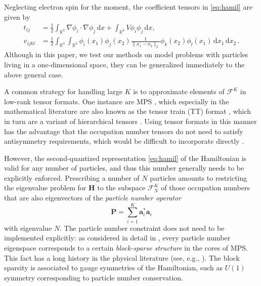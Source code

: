 \documentclass[a4paper,11pt,oneside]{amsart}
\providecommand{\norm}[1]{\lVert#1\rVert}
\theoremstyle{definition}
\theoremstyle{remark}
\newcommand{\sdd}{\,\mathrm{d}}
\newcommand{\R}{\mathbb{R}}
\newcommand{\ten}[1]{\boldsymbol{#1}}
\numberwithin{equation}{section}
\numberwithin{theorem}{section}
\begin{document}
 
 Neglecting electron spin for the moment, the coefficient tensors in \eqref{eq:hamil} are given by
 \begin{equation}\label{eq:tvdef}
 \begin{aligned}
   t_{ij} &=  \frac12  \int_{\R^3}  \nabla\phi_i \cdot\nabla \phi_j \sdd x + \int_{\R^3} V \phi_i \phi_j \sdd x, \\ v_{ijkl} &= \frac12 \int_{\R^3} \int_{\R^3}  \phi_i(x_1) \phi_j(x_2) \frac{1}{\norm{x_1 - x_2}_2} \phi_k(x_2) \phi_l(x_1) \sdd x_1 \sdd x_2\,.
   \end{aligned}
 \end{equation}
 Although in this paper, we test our methods on model problems with particles living in a one-dimensional space, they can be generalized immediately to the above general case.
 
A common strategy for handling large $K$ is to approximate elements of $\mathcal{F}^K$ in low-rank tensor formats. One instance are MPS \cite{white,vidal03}, which especially in the mathematical literature are also known as the tensor train (TT) format \cite{Oseledets:2011:TT}, which in turn are a variant of hierarchical tensors \cite{Hackbusch:09,Hackbusch:12tensorspaces}.  
Using tensor formats in this manner has the advantage that the occupation number tensors do not need to satisfy antisymmetry requirements, which would be difficult to incorporate directly \cite{Hackbusch:18}.

However, the second-quantized representation \eqref{eq:hamil} of the Hamiltonian is valid for any number of particles, and thus this number generally needs to be explicitly enforced.
Prescribing a number of $N$ particles amounts to restricting the eigenvalue problem for $\ten{H}$ to the subspace $\mathcal{F}_N^K$ of those occupation numbers that are also eigenvectors of the
\emph{particle number operator}
 \[
  \ten{P} = \sum_{i=1}^K \ten{a}_i^\ast \ten{a}_i
\]
with eigenvalue $N$. The particle number constraint does not need to be implemented explicitly: as considered in detail in \cite{BGP:22}, every particle number eigenspace corresponds to a certain \emph{block-sparse structure} in the cores of MPS. This fact has a long history in the physical literature (see, e.g., \cite{OR95,Daley:04,McCulloch:07,Schollwoeck:11,SPV11}). The block sparsity is associated to gauge symmetries of the Hamiltonian, such as $U(1)$ symmetry corresponding to particle number conservation.
\end{document}
